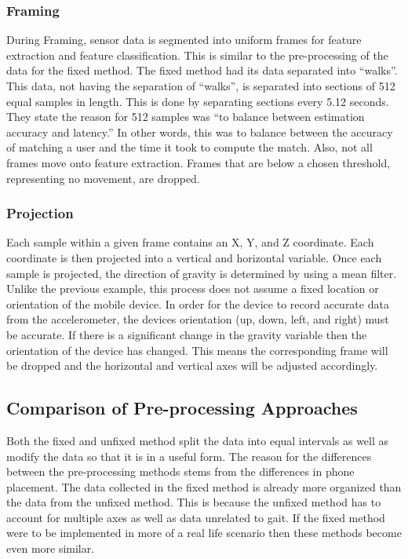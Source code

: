 \documentclass{sig-alternate}
\begin{document}
		
			
\subsubsection{Framing}{
 During Framing, sensor data is segmented into uniform frames for feature extraction and feature classification. This is similar to the pre-processing of the data for the fixed method. The fixed method had its data separated into ``walks''. This data, not having the separation of ``walks'', is separated into sections of 512 equal samples in length. This is done by separating sections every 5.12 seconds. They state the reason for 512 samples was ``to balance between estimation accuracy and latency.'' In other words, this was to balance between the accuracy of matching a user and the time it took to compute the match. Also, not all frames move onto feature extraction. Frames that are below a chosen threshold, representing no movement, are dropped. }
 			
\subsubsection{Projection}{
	Each sample within a given frame contains an X, Y, and Z coordinate. Each coordinate is then projected into a vertical and horizontal variable. Once each sample is projected, the direction of gravity is determined by using a mean filter. Unlike the previous example, this process does not assume a fixed location or orientation of the mobile device. In order for the device to record accurate data from the accelerometer, the devices orientation (up, down, left, and right) must be accurate. If there is a significant change in the gravity variable then the orientation of the device has changed. This means the corresponding frame will be dropped and the horizontal and vertical axes will be adjusted accordingly. 
}
\subsection{Comparison of Pre-processing Approaches}
	Both the fixed and unfixed method split the data into equal intervals as well as modify the data so that it is in a useful form. The reason for the differences between the pre-processing methods stems from the differences in phone placement. The data collected in the fixed method is already more organized than the data from the unfixed method. This is because the unfixed method has to account for multiple axes as well as data unrelated to gait. If the fixed method were to be implemented in more of a real life scenario then these methods become even more similar. 
\end{document}

